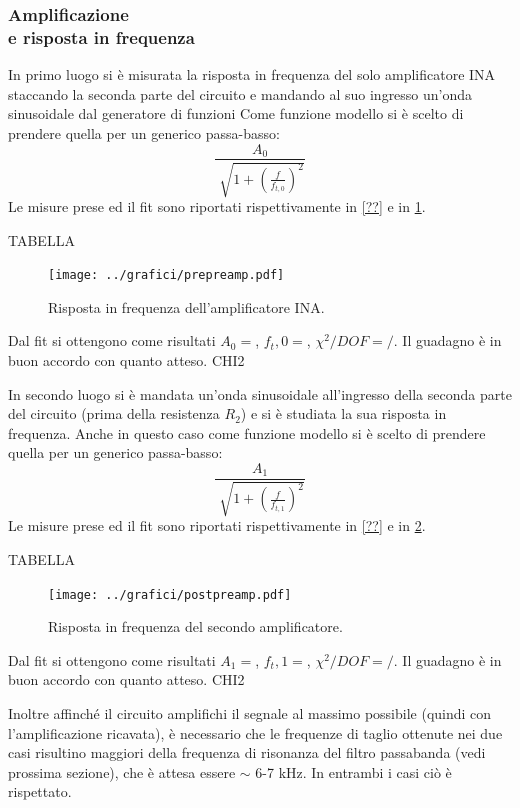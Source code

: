 \documentclass[a4paper,10pt]{article}
\begin{document}
\subsubsection*{Amplificazione \\e risposta in frequenza}

In primo luogo si è misurata la risposta in frequenza del solo amplificatore INA staccando la seconda parte del circuito e mandando al suo ingresso un'onda sinusoidale dal generatore di funzioni%
Come funzione modello si è scelto di prendere quella per un generico passa-basso:
\begin{equation}
\frac{A_0}{\sqrt[]{1+(\frac{f}{f_{t,0}})^2}}
\end{equation}
Le misure prese ed il fit sono riportati rispettivamente in \cref{??} e in \cref{fig:prepreamp}.

TABELLA


\begin{figure}[H]
	\centering
	\texttt{[image: ../grafici/prepreamp.pdf]}
	\caption{Risposta in frequenza dell'amplificatore INA.}
	\label{fig:prepreamp}
\end{figure}


Dal fit si ottengono come risultati $A_0 = $, $f_t,0 = $, $\chi^2/DOF = /$. Il guadagno è in buon accordo con quanto atteso. 
CHI2

In secondo luogo si è mandata un'onda sinusoidale all'ingresso della seconda parte del circuito (prima della resistenza $R_2$) e si è studiata la sua risposta in frequenza.
Anche in questo caso come funzione modello si è scelto di prendere quella per un generico passa-basso:
\begin{equation}
\frac{A_1}{\sqrt[]{1+(\frac{f}{f_{t,1}})^2}}
\end{equation}
 Le misure prese ed il fit sono riportati rispettivamente in \cref{??} e in \cref{fig:postpreamp}.

TABELLA


\begin{figure}[H]
	\centering
	\texttt{[image: ../grafici/postpreamp.pdf]}
	\caption{Risposta in frequenza del secondo amplificatore.}
	\label{fig:postpreamp}
\end{figure}

Dal fit si ottengono come risultati $A_1 = $, $f_t,1 = $, $\chi^2/DOF = /$. Il guadagno è in buon accordo con quanto atteso. 
CHI2

Inoltre affinché il circuito amplifichi il segnale al massimo possibile (quindi con l'amplificazione ricavata), è necessario che le frequenze di taglio ottenute nei due casi risultino maggiori della frequenza di risonanza del filtro passabanda (vedi prossima sezione), che è attesa essere $\sim$ 6-7 kHz. In entrambi i casi ciò è rispettato.
\end{document}
